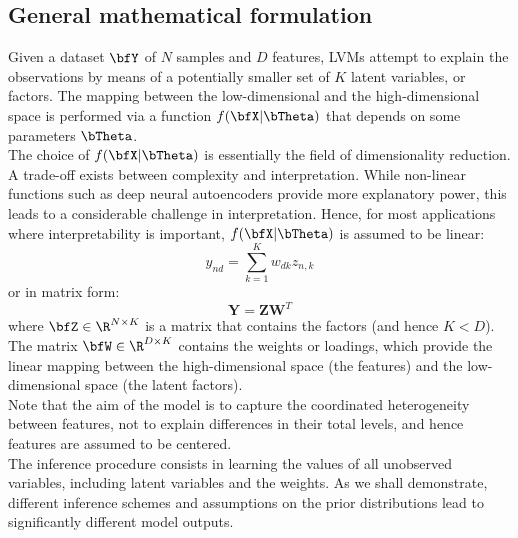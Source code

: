 \subsection{General mathematical formulation}
Given a dataset $\bfY$ of $N$ samples and $D$ features, LVMs attempt to explain the observations by means of a potentially smaller set of $K$ latent variables, or factors. The mapping between the low-dimensional and the high-dimensional space is performed via a function $f(\bfX|\bTheta)$ that depends on some parameters $\bTheta$.\\

The choice of $f(\bfX|\bTheta)$ is essentially the field of dimensionality reduction. A trade-off exists between complexity and interpretation. While non-linear functions such as deep neural autoencoders provide more explanatory power\cite{}, this leads to a considerable challenge in interpretation. Hence, for most applications where interpretability is important, $f(\bfX|\bTheta)$ is assumed to be linear:
\begin{equation} 
	y_{nd} = \sum_{k=1}^{K} w_{dk}z_{n,k}
\end{equation}
or in matrix form:
\begin{equation} \label{eq:linear_model}
	\mathbf{Y} = \mathbf{Z}\mathbf{W}^{T}
\end{equation}
where $\bfZ \in \R^{N \times K}$ is a matrix that contains the factors (and hence $K<D$). The matrix $\bfW \in \R^{D \times K}$ contains the weights or loadings, which provide the linear mapping between the high-dimensional space (the features) and the low-dimensional space (the latent factors).\\
Note that the aim of the model is to capture the coordinated heterogeneity between features, not to explain differences in their total levels, and hence features are assumed to be centered.\\

The inference procedure consists in learning the values of all unobserved variables, including latent variables and the weights. As we shall demonstrate, different inference schemes and assumptions on the prior distributions lead to significantly different model outputs.


